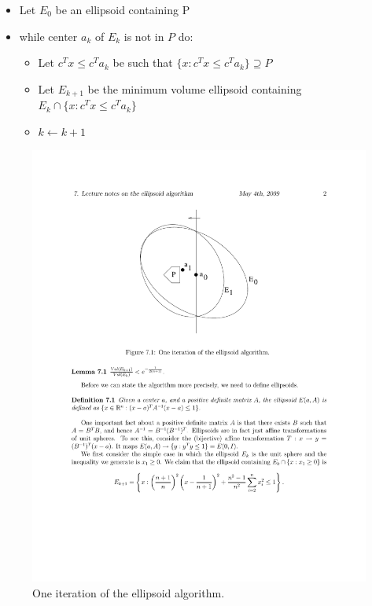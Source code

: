\documentclass[12pt]{article}
\begin{document}
\begin{itemize}
\item
	Let $E_0$ be an ellipsoid containing P
\item
	while center $a_k$ of $E_k$ is not in $P$ do:
\begin{itemize}
\item
Let $c^{T}x \leq c^{T}a_k$ be such that $\{x:c^Tx\leq c^Ta_k\}\supseteq P$
\item
Let $E_{k+1}$ be the minimum volume ellipsoid containing $E_k \cap
\{x:c^Tx\leq c^{T}a_k\}$
\item
$k \leftarrow k+1$
\end{itemize}
\end{itemize}

\begin{figure}[htbp]
\begin{center}
\includegraphics[scale=0.7]{../figures/ellipsoid}
\end{center}
\caption{One iteration of the ellipsoid algorithm. }
\label{ellip}
\end{figure}
\end{document}
